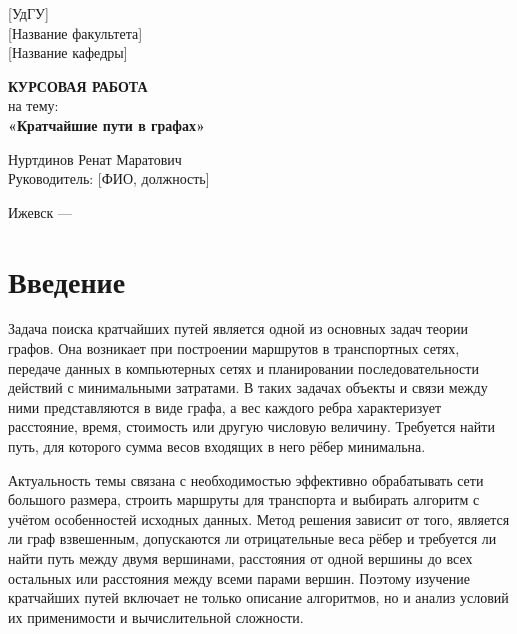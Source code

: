\documentclass[14pt,a4paper]{extarticle}
\begin{document}
\begin{titlepage}
    \begin{center}
        [УдГУ]\\
        {[Название факультета]}\\
        {[Название кафедры]}

        \vfill

        \textbf{КУРСОВАЯ РАБОТА}\\[0.5cm]
        на тему:\\[0.3cm]
        \textbf{«Кратчайшие пути в графах»}
    \end{center}

    \vspace{2cm}

    \begin{flushright}
        Нуртдинов Ренат Маратович\\[0.5cm]
        Руководитель: [ФИО, должность]
    \end{flushright}

    \vfill

    \begin{center}
        Ижевск --- \the\year
    \end{center}
\end{titlepage}

\tableofcontents
\newpage

\section*{Введение}

Задача поиска кратчайших путей является одной из основных задач теории
графов. Она возникает при построении маршрутов в транспортных сетях,
передаче данных в компьютерных сетях и планировании последовательности
действий с минимальными затратами. В таких задачах объекты и связи между
ними представляются в виде графа, а вес каждого ребра характеризует
расстояние, время, стоимость или другую числовую величину. Требуется найти
путь, для которого сумма весов входящих в него рёбер минимальна.

Актуальность темы связана с необходимостью эффективно обрабатывать сети
большого размера, строить маршруты для транспорта и выбирать алгоритм с 
учётом особенностей исходных данных.
Метод решения зависит от того, является ли граф взвешенным, допускаются ли
отрицательные веса рёбер и требуется ли найти путь между двумя вершинами,
расстояния от одной вершины до всех остальных или расстояния между всеми
парами вершин. Поэтому изучение кратчайших путей включает не только описание
алгоритмов, но и анализ условий их применимости и вычислительной сложности.
\end{document}
